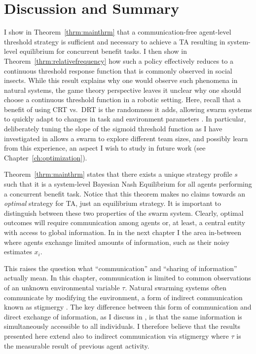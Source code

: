 \documentclass[defaultstyle,12pt]{proposal}
\begin{document}
\section{Discussion and Summary}\label{sec:discsum}
I show in Theorem~\ref{thrm:mainthrm} that a communication-free agent-level threshold strategy is sufficient and necessary to achieve a TA resulting in system-level equilibrium for concurrent benefit tasks. I then show in Theorem~\ref{thrm:relativefrequency} how such a policy effectively reduces to a continuous threshold response function that is commonly observed in social insects. While this result explains why one would observe such phenomena in natural systems, the game theory perspective leaves it unclear why one should choose a continuous threshold function in a robotic setting. Here, recall that a benefit of using CRT vs.~DRT is the randomness it adds, allowing swarm systems to quickly adapt to changes in task and environment parameters \cite{Bonabeau1997}. In particular, deliberately tuning the slope of the sigmoid threshold function as I have investigated in \cite{Kanakia2014} allows a swarm to explore different team sizes, and possibly learn from this experience, an aspect I wish to study in future work (see Chapter~\ref{ch:optimization}). 

Theorem~\ref{thrm:mainthrm} states that there exists a unique strategy profile $s$ such that it is a system-level Bayesian Nash Equilibrium for all agents performing a concurrent benefit task. Notice that this theorem makes no claims towards an \emph{optimal} strategy for TA, just an equilibrium strategy. It is important to distinguish between these two properties of the swarm system. Clearly, optimal outcomes will require communication among agents or, at least, a central entity with access to global information. In in the next chapter I the area in-between where agents exchange limited amounts of information, such as their noisy estimates $x_i$.

This raises the question what ``communication'' and ``sharing of information'' actually mean. In this chapter, communication is limited to common observations of an unknown environmental variable $\tau$. Natural swarming systems often communicate by modifying the environment, a form of indirect communication known as stigmergy \cite{Grasse1959}. The key difference between this form of communication and direct exchange of information, as I discuss in \cite{Touri2014}, is that the same information is simultaneously accessible to all individuals. I therefore believe that the results presented here extend also to indirect communication via stigmergy where $\tau$ is the measurable result of previous agent activity.
\end{document}
